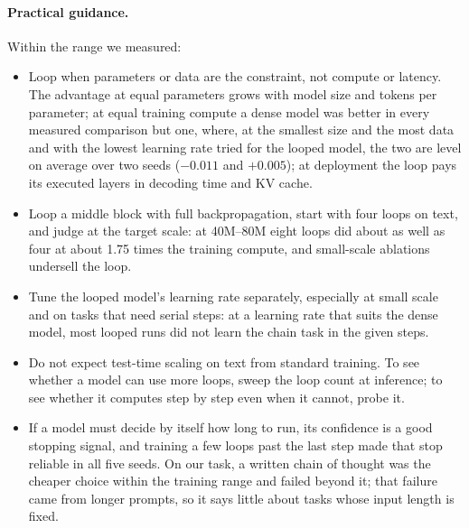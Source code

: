 \paragraph{Practical guidance.} Within the range we measured:
\begin{itemize}
  \item Loop when parameters or data are the constraint, not compute or latency. The advantage at equal parameters
  grows with model size and tokens per parameter; at equal training compute a dense model was better in every
  measured comparison but one, where, at the smallest size and the most data and with the lowest learning rate tried for
  the looped model, the two are level on average over two seeds ($-0.011$ and $+0.005$); at deployment the loop pays its executed layers in decoding time and KV cache.
  \item Loop a middle block with full backpropagation, start with four loops on text, and judge at the target scale:
  at 40M--80M eight loops did about as well as four at about 1.75 times the training compute, and small-scale ablations undersell
  the loop.
  \item Tune the looped model's learning rate separately, especially at small scale and on tasks that need serial
  steps: at a learning rate that suits the dense model, most looped runs did not learn the chain task in the given
  steps.
  \item Do not expect test-time scaling on text from standard training. To see whether a model can use more loops,
  sweep the loop count at inference; to see whether it computes step by step even when it cannot, probe it.
  \item If a model must decide by itself how long to run, its confidence is a good stopping signal, and training a few
  loops past the last step made that stop reliable in all five seeds. On our task, a written chain of thought was the cheaper choice
  within the training range and failed beyond it; that failure came from longer prompts, so it says little about tasks
  whose input length is fixed.
\end{itemize}
